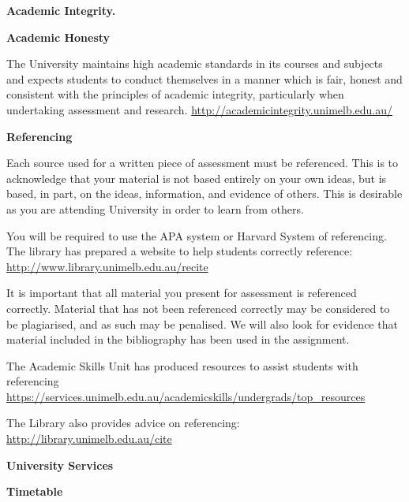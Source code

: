 \documentclass[10pt]{article}
\begin{document}
\begin{multicols}{2}
\small
\bigskip\noindent\textbf{\large Academic Integrity.} 

\smallskip\noindent\textbf{Academic Honesty}

\smallskip\noindent The University maintains high academic standards in its courses and subjects and expects students to conduct themselves in a manner which is fair, honest and consistent with the principles of academic integrity, particularly when undertaking assessment and research. \href{http://academicintegrity.unimelb.edu.au/}{http://academicintegrity.unimelb.edu.au/}

\smallskip\noindent\textbf{Referencing}

\smallskip\noindent Each source used for a written piece of assessment must be referenced. This is to acknowledge that your material is not based entirely on your own ideas, but is based, in part, on the ideas, information, and evidence of others. This is desirable as you are attending University in order to learn from others.

\smallskip\noindent You will be required to use the APA system or Harvard System of referencing. The library has prepared a website to help students correctly reference: 
\href{http://www.library.unimelb.edu.au/recite}{http://www.library.unimelb.edu.au/recite}

\smallskip\noindent It is important that all material you present for assessment is referenced correctly. Material that has not been referenced correctly may be considered to be plagiarised, and as such may be penalised. We will also look for evidence that material included in the bibliography has been used in the assignment. 

\smallskip\noindent The Academic Skills Unit has produced resources to assist students with referencing\\ \href{https://services.unimelb.edu.au/academicskills/undergrads/top\_resources}{https://services.unimelb.edu.au/academicskills/undergrads/top\_resources}

\smallskip\noindent The Library also provides advice on referencing:\\ \href{http://library.unimelb.edu.au/cite}{http://library.unimelb.edu.au/cite}








\bigskip\noindent\textbf{\large University Services}

\smallskip\noindent\textbf{Timetable}


\end{multicols}
\end{document}
